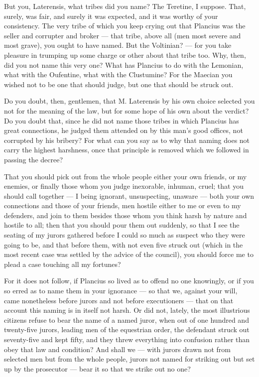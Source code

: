  But you, Laterensis, what tribes did you name? The Teretine, I suppose. That, surely, was fair, and surely it was expected, and it was worthy of your consistency. The very tribe of which you keep crying out that Plancius was the seller and corrupter and broker --- that tribe, above all (men most severe and most grave), you ought to have named. But the Voltinian? --- for you take pleasure in trumping up some charge or other about that tribe too. Why, then, did you not name this very one? What has Plancius to do with the Lemonian, what with the Oufentine, what with the Clustumine? For the Maecian you wished not to be one that should judge, but one that should be struck out.

 Do you doubt, then, gentlemen, that M. Laterensis by his own choice selected you not for the meaning of the law, but for some hope of his own about the verdict? Do you doubt that, since he did not name those tribes in which Plancius has great connections, he judged them attended on by this man's good offices, not corrupted by his bribery? For what can you say as to why that naming does not carry the highest harshness, once that principle is removed which we followed in passing the decree?

 That you should pick out from the whole people either your own friends, or my enemies, or finally those whom you judge inexorable, inhuman, cruel; that you should call together --- I being ignorant, unsuspecting, unaware --- both your own connections and those of your friends, men hostile either to me or even to my defenders, and join to them besides those whom you think harsh by nature and hostile to all; then that you should pour them out suddenly, so that I see the seating of my jurors gathered before I could so much as suspect who they were going to be, and that before them, with not even five struck out (which in the most recent case was settled by the advice of the council), you should force me to plead a case touching all my fortunes?

 For it does not follow, if Plancius so lived as to offend no one knowingly, or if you so erred as to name them in your ignorance --- so that we, against your will, came nonetheless before jurors and not before executioners --- that on that account this naming is in itself not harsh. Or did not, lately, the most illustrious citizens refuse to bear the name of a named juror, when out of one hundred and twenty-five jurors, leading men of the equestrian order, the defendant struck out seventy-five and kept fifty, and they threw everything into confusion rather than obey that law and condition? And shall we --- with jurors drawn not from selected men but from the whole people, jurors not named for striking out but set up by the prosecutor --- bear it so that we strike out no one?

